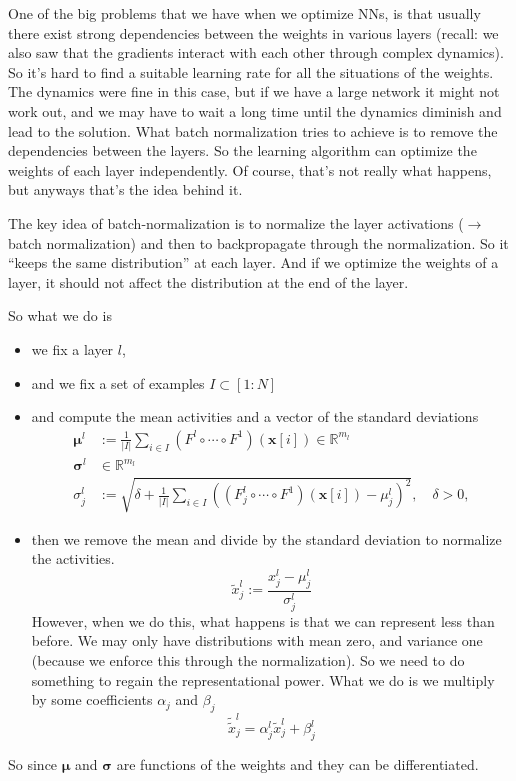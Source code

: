\documentclass[a2paper,8pt]{extarticle}
\newcommand{\R}{\mathbb{R}}
\newcommand{\card}[1]{\left\lvert #1 \right\rvert}
\renewcommand{\vec}[1]{\mathbf{#1}}
\newcommand{\vx}{\vec{x}}
\newcommand{\vmu}{\boldsymbol{\mu}}
\newcommand{\vsigma}{\boldsymbol{\sigma}}
\newcommand{\ssep}{\hdashrule[1.1ex]{\linewidth}{0.1pt}{0.3mm}\vspace{-6pt}}
\newcommand{\ssep}{\hdashrule[1.1ex]{\linewidth}{0.1pt}{0.3mm}\vspace{-3pt}}
\begin{document}
\begin{landscape}
\begin{multicols*}{7}
One of the big problems that we have when we optimize NNs, is that usually there
exist strong dependencies between the weights in various layers (recall: we also
saw that the gradients interact with each other through complex dynamics). So
it's hard to find a suitable learning rate for all the situations of the
weights. The dynamics were fine in this case, but if we have a large network it
might not work out, and we may have to wait a long time until the dynamics
diminish and lead to the solution. What batch normalization tries to achieve is
to remove the dependencies between the layers. So the learning algorithm can
optimize the weights of each layer independently. Of course, that's not really
what happens, but anyways that's the idea behind it.

\ssep

The key idea of batch-normalization is to normalize the layer activations
($\to$ batch normalization) and then to backpropagate through the normalization.
So it ``keeps the same distribution'' at each layer. And if we optimize the
weights of a layer, it should not affect the distribution at the end of the
layer.

So what we do is
\begin{itemize}
  \item we fix a layer $l$,
  \item and we fix a set of examples $I\subset[1:N]$
  \item and compute the mean activities and a vector of the standard deviations
\begin{align*}
\vmu^{l}
&:=
\frac{1}{\card{I}}
\sum_{i\in I}
(F^l\circ\cdots\circ F^1)(\vx[i])\in\R^{m_l}
\\
\vsigma^l&\in\R^{m_l}
\\
\sigma_j^l
&:=
\sqrt{
\delta
+
\frac{1}{\card{I}}
\sum_{i\in I}
\left(
(F^l_j\circ\cdots\circ F^1)(\vx[i])
-\mu_j^l
\right)^2
},
\quad
\delta > 0,
\end{align*}
  \item then we remove the mean and divide by the standard deviation to
  normalize the activities.
  \[
  \tilde{x}_j^l
  :=\frac{x_j^l-\mu_j^l}{\sigma_j^l}
  \]
  However, when we do this, what happens is that we can represent less than
  before. We may only have distributions with mean zero, and variance one
  (because we enforce this through the normalization). So we need to do
  something to regain the representational power. What we do is we multiply by
  some coefficients $\alpha_j$ and $\beta_j$
  \[
  \tilde{\tilde{x}}_j^l=\alpha_j^l\tilde{x}_j^l+\beta_j^l
  \]
\end{itemize}
So since $\vmu$ and $\vsigma$ are functions of the weights and they can be
differentiated. 


\end{multicols*}
\end{landscape}
\end{document}
